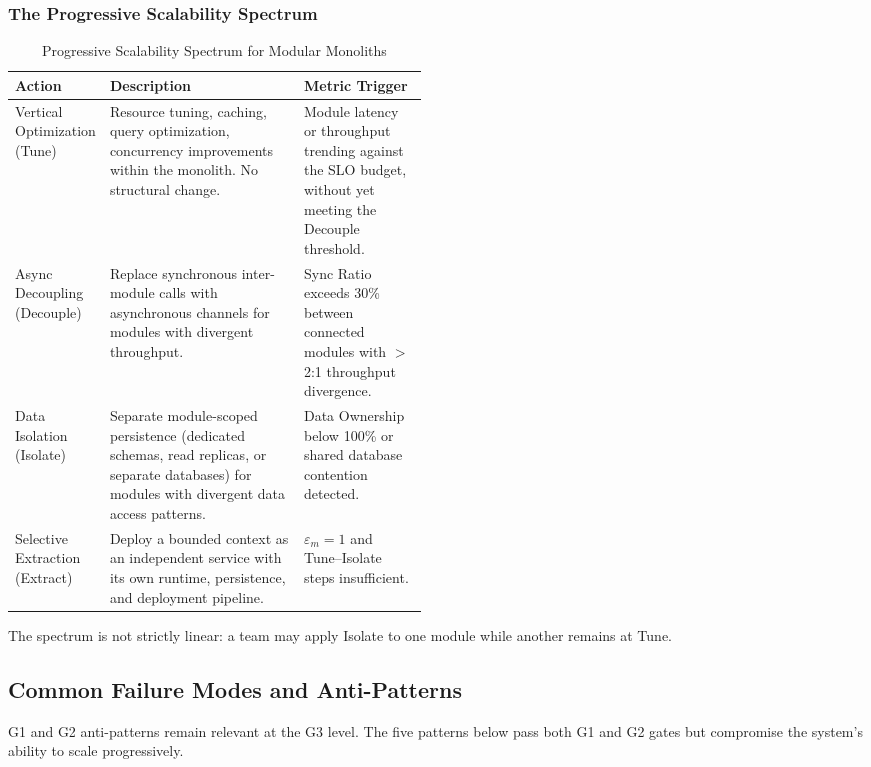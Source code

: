 \subsubsection*{The Progressive Scalability Spectrum}

\begin{table}[H]
\centering
\small
\caption{Progressive Scalability Spectrum for Modular Monoliths}
\label{tab:scalability-spectrum}
\begin{tabularx}{\linewidth}{>{\raggedright\arraybackslash\hyphenpenalty=10000}p{0.18\linewidth} X p{0.30\linewidth}}
\toprule
\textbf{Action} & \textbf{Description} & \textbf{Metric Trigger} \\
\midrule
Vertical Optimization (Tune) & Resource tuning, caching, query optimization, concurrency improvements within the monolith. No structural change. & Module latency or throughput trending against the SLO budget, without yet meeting the Decouple threshold. \\
Async Decoupling (Decouple) & Replace synchronous inter-module calls with asynchronous channels for modules with divergent throughput. & Sync Ratio exceeds 30\% between connected modules with $>$2:1 throughput divergence. \\
Data Isolation (Isolate) & Separate module-scoped persistence (dedicated schemas, read replicas, or separate databases) for modules with divergent data access patterns. & Data Ownership below 100\% or shared database contention detected. \\
Selective Extraction (Extract) & Deploy a bounded context as an independent service with its own runtime, persistence, and deployment pipeline. & $\varepsilon_m = 1$ and Tune--Isolate steps insufficient. \\
\bottomrule
\end{tabularx}
\end{table}

\noindent
The spectrum is not strictly linear: a team may apply Isolate to one module while another remains at Tune.


\subsection*{Common Failure Modes and Anti-Patterns}

G1 and G2 anti-patterns remain relevant at the G3 level. The five patterns below pass both G1 and G2 gates but compromise the system's ability to scale progressively.

